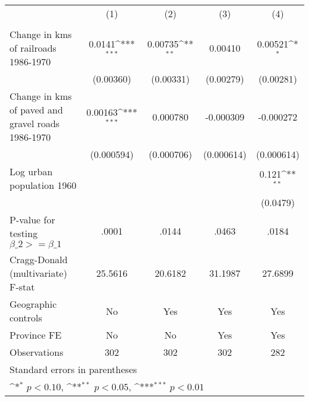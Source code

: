 {
\def\sym#1{\ifmmode^{#1}\else\(^{#1}\)\fi}
\begin{tabular}{l*{4}{c}}
\hline\hline
                &\multicolumn{1}{c}{(1)}&\multicolumn{1}{c}{(2)}&\multicolumn{1}{c}{(3)}&\multicolumn{1}{c}{(4)}\\
                &\multicolumn{1}{c}{}&\multicolumn{1}{c}{}&\multicolumn{1}{c}{}&\multicolumn{1}{c}{}\\
\hline
Change in kms of railroads 1986-1970&   0.0141\sym{***}&  0.00735\sym{**} &  0.00410         &  0.00521\sym{*}  \\
                &(0.00360)         &(0.00331)         &(0.00279)         &(0.00281)         \\
[1em]
Change in kms of paved and gravel roads 1986-1970&  0.00163\sym{***}& 0.000780         &-0.000309         &-0.000272         \\
                &(0.000594)         &(0.000706)         &(0.000614)         &(0.000614)         \\
[1em]
Log urban population 1960&                  &                  &                  &    0.121\sym{**} \\
                &                  &                  &                  & (0.0479)         \\
\hline
P-value for testing $\beta\_{2} >= \beta\_{1}$&    .0001         &    .0144         &    .0463         &    .0184         \\
Cragg-Donald (multivariate) F-stat&  25.5616         &  20.6182         &  31.1987         &  27.6899         \\
Geographic controls&       No         &      Yes         &      Yes         &      Yes         \\
Province FE     &       No         &       No         &      Yes         &      Yes         \\
Observations    &      302         &      302         &      302         &      282         \\
\hline\hline
\multicolumn{5}{l}{\footnotesize Standard errors in parentheses}\\
\multicolumn{5}{l}{\footnotesize \sym{*} \(p<0.10\), \sym{**} \(p<0.05\), \sym{***} \(p<0.01\)}\\
\end{tabular}
}
